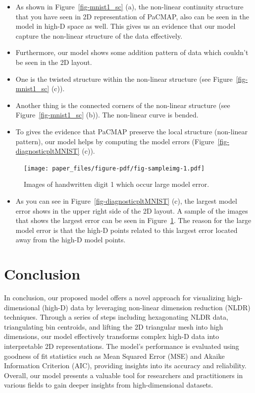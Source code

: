 \documentclass[
  12pt]{article}
\providecommand{\tightlist}{%
  \setlength{\itemsep}{0pt}\setlength{\parskip}{0pt}}\usepackage{longtable,booktabs,array}
\begin{document}
\begin{itemize}
\item
  As shown in Figure~\ref{fig-mnist1_sc} (a), the non-linear continuity
  structure that you have seen in 2D representation of PaCMAP, also can
  be seen in the model in high-D space as well. This gives us an
  evidence that our model capture the non-linear structure of the data
  effectively.
\item
  Furthermore, our model shows some addition pattern of data which
  couldn't be seen in the 2D layout.
\item
  One is the twisted structure within the non-linear structure (see
  Figure~\ref{fig-mnist1_sc} (c)).
\item
  Another thing is the connected corners of the non-linear structure
  (see Figure~\ref{fig-mnist1_sc} (b)). The non-linear curve is bended.
\item
  To gives the evidence that PaCMAP preserve the local structure
  (non-linear pattern), our model helps by computing the model errors
  (Figure~\ref{fig-diagnosticpltMNIST} (c)).
\end{itemize}

\begin{figure}[H]

{\centering \texttt{[image: paper\_files/figure-pdf/fig-sampleimg-1.pdf]}

}

\caption{\label{fig-sampleimg}Images of handwritten digit 1 which occur
large model error.}

\end{figure}

\begin{itemize}
\tightlist
\item
  As you can see in Figure~\ref{fig-diagnosticpltMNIST} (c), the largest
  model error shows in the upper right side of the 2D layout. A sample
  of the images that shows the largest error can be seen in
  Figure~\ref{fig-sampleimg}. The reason for the large model error is
  that the high-D points related to this largest error located away from
  the high-D model points.
\end{itemize}

\hypertarget{sec-conclusion}{%
\section{Conclusion}\label{sec-conclusion}}

In conclusion, our proposed model offers a novel approach for
visualizing high-dimensional (high-D) data by leveraging non-linear
dimension reduction (NLDR) techniques. Through a series of steps
including hexagonating NLDR data, triangulating bin centroids, and
lifting the 2D triangular mesh into high dimensions, our model
effectively transforms complex high-D data into interpretable 2D
representations. The model's performance is evaluated using goodness of
fit statistics such as Mean Squared Error (MSE) and Akaike Information
Criterion (AIC), providing insights into its accuracy and reliability.
Overall, our model presents a valuable tool for researchers and
practitioners in various fields to gain deeper insights from
high-dimensional datasets.
\end{document}

